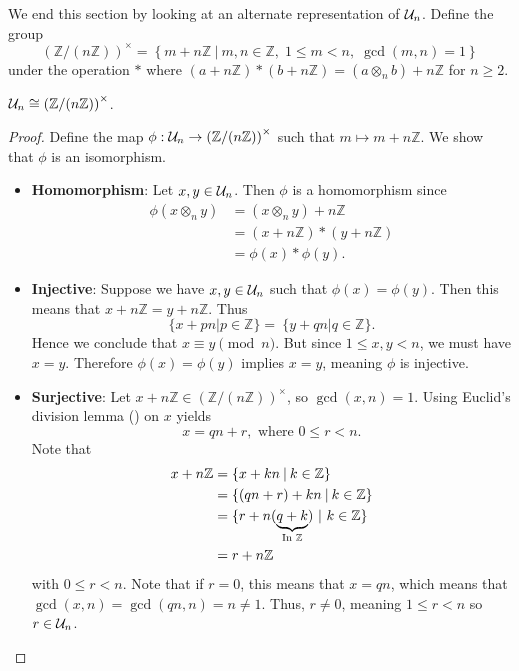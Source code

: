 We end this section by looking at an alternate representation of $\mathcal{U}_{n}$. Define the group
\[
    \left(\mathbb{Z}/(n\mathbb{Z})\right)^{\times} = \left\{m + n\mathbb{Z} \ \vert \ m,n \in \mathbb{Z},\; 1 \leq m < n,\; \gcd(m, n)=1\right\}
\]
under the operation $\ast$ where $(a+n\mathbb{Z})\ast(b+n\mathbb{Z}) = (a\otimes_n b) + n\mathbb{Z}$ for $n \geq 2$.
\begin{proposition}
    $\mathcal{U}_{n} \cong \left(\mathbb{Z}/(n\mathbb{Z})\right)^{\times}$.
\end{proposition}
\begin{proof}
    Define the map $\phi: \mathcal{U}_{n} \to \left(\mathbb{Z}/(n\mathbb{Z})\right)^{\times}$ such that $m \mapsto m + n\mathbb{Z}$. We show that $\phi$ is an isomorphism.

    \begin{itemize}
        \item \textbf{Homomorphism}: Let $x, y \in \mathcal{U}_{n}$. Then $\phi$ is a homomorphism since
        \begin{align*}
            \phi(x \otimes_n y) &= (x \otimes_n y) + n\mathbb{Z}\\
            &= (x + n\mathbb{Z}) \ast (y + n\mathbb{Z})\\
            &= \phi(x) \ast \phi(y).
        \end{align*}

        \item \textbf{Injective}: Suppose we have $x, y \in \mathcal{U}_{n}$ such that $\phi(x) = \phi(y)$. Then this means that $x + n\mathbb{Z} = y + n\mathbb{Z}$. Thus
        \[
            \{x + pn \vert p \in \mathbb{Z} \} = \ \{y + qn \vert q \in \mathbb{Z} \}.
        \]
        Hence we conclude that $x \equiv y \pmod{n}$. But since $1 \leq x, y < n$, we must have $x = y$. Therefore $\phi(x) = \phi(y)$ implies $x = y$, meaning $\phi$ is injective.

        \item \textbf{Surjective}: Let $x + n\mathbb{Z} \in (\mathbb{Z}/(n\mathbb{Z}))^\times$, so $\gcd(x,n) = 1$. Using Euclid's division lemma () on $x$ yields
        \[
            x = qn + r, \text{ where } 0 \leq r < n.
        \]
        Note that
        \begin{align*}
            x + n\mathbb{Z} &= \{x + kn \vert k \in \mathbb{Z}\}\\
            &= \{(qn + r) + kn \vert k \in \mathbb{Z}\}\\
            &= \{r + n(\underbrace{q+k}_{\text{In } \mathbb{Z}}) \vertalt k \in \mathbb{Z}\}\\
            &= r + n\mathbb{Z}
        \end{align*}
        with $0 \leq r < n$. Note that if $r = 0$, this means that $x = qn$, which means that $\gcd(x, n) = \gcd(qn, n) = n \neq 1$. Thus, $r \neq 0$, meaning $1 \leq r < n$ so $r \in \mathcal{U}_{n}$.


\end{itemize}
\end{proof}

